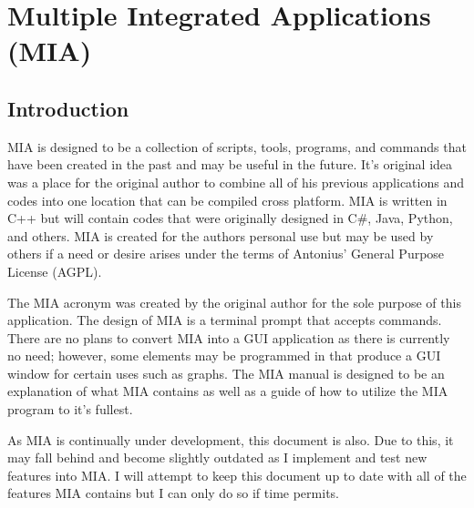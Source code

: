 \chapter{Multiple Integrated Applications (MIA)}
\pagestyle{fancy}

\section{Introduction}

MIA is designed to be a collection of scripts, tools, programs, and commands that have been created in the past and may be useful in the future. It's original idea was a place for the original author to combine all of his previous applications and codes into one location that can be compiled cross platform. MIA is written in C++ but will contain codes that were originally designed in C\#, Java, Python, and others. MIA is created for the authors personal use but may be used by others if a need or desire arises under the terms of Antonius’ General Purpose License (AGPL). 

The MIA acronym was created by the original author for the sole purpose of this application. The design of MIA is a terminal prompt that accepts commands. There are no plans to convert MIA into a GUI application as there is currently no need; however, some elements may be programmed in that produce a GUI window for certain uses such as graphs. The MIA manual is designed to be an explanation of what MIA contains as well as a guide of how to utilize the MIA program to it's fullest. 

As MIA is continually under development, this document is also. Due to this, it may fall behind and become slightly outdated as I implement and test new features into MIA. I will attempt to keep this document up to date with all of the features MIA contains but I can only do so if time permits.



